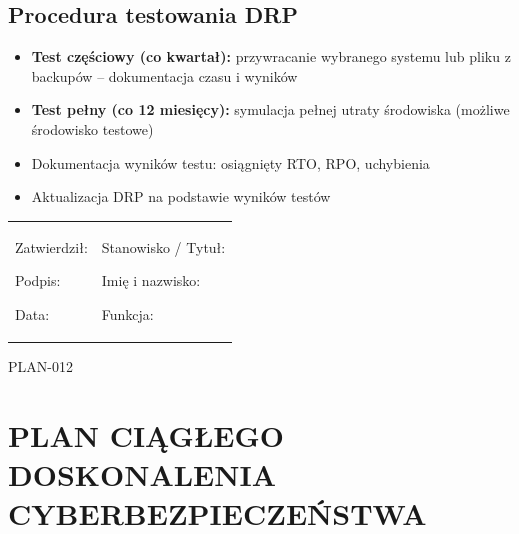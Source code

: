 \documentclass[12pt,a4paper]{article}
\providecommand{\tightlist}{\setlength{\itemsep}{0pt}\setlength{\parskip}{0pt}}
\begin{document}
\subsection{Procedura testowania DRP}\label{procedura-testowania-drp}

\begin{itemize}
\tightlist
\item
  \textbf{Test częściowy (co kwartał):} przywracanie wybranego systemu
  lub pliku z backupów -- dokumentacja czasu i wyników
\item
  \textbf{Test pełny (co 12 miesięcy):} symulacja pełnej utraty
  środowiska (możliwe środowisko testowe)
\item
  Dokumentacja wyników testu: osiągnięty RTO, RPO, uchybienia
\item
  Aktualizacja DRP na podstawie wyników testów
\end{itemize}

\begin{longtable}[]{@{}
  >{\raggedright\arraybackslash}p{}
  >{\raggedright\arraybackslash}p{}@{}}
\toprule\noalign{}
\endhead
\bottomrule\noalign{}
\endlastfoot
\begin{minipage}[t]{\linewidth}\raggedright
Zatwierdził:

Podpis: \underline{\hspace{3cm}}

Data: \underline{\hspace{4cm}}
\end{minipage} & \begin{minipage}[t]{\linewidth}\raggedright
Stanowisko / Tytuł:

Imię i nazwisko: \underline{\hspace{3cm}}

Funkcja: \underline{\hspace{3cm}}
\end{minipage} \\
\end{longtable}

\label{doc12}
PLAN-012

\newpage 

\section{PLAN CIĄGŁEGO DOSKONALENIA
CYBERBEZPIECZEŃSTWA}\label{plan-ciux105gux142ego-doskonalenia-cyberbezpieczeux144stwa}
\end{document}
